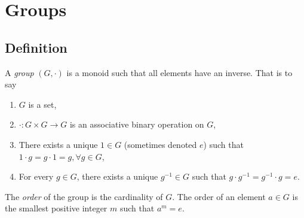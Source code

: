 \section{Groups}

\subsection{Definition}

\begin{defn}[Group]
  \label{def:group}
  A \emph{group} $(G, \cdot)$ is a monoid such that all elements have an inverse.
  That is to say
  \begin{enumerate}
    \item{$G$ is a set,
         }
    \item{$\cdot : G \times G \to G$ is an associative binary operation on $G$,
         }
    \item{There exists a unique $1 \in G$ (sometimes denoted $e$) such that
          $1 \cdot g = g \cdot 1 = g, \forall g \in G$,
         }
    \item{For every $g \in G$, there exists a unique $g^{-1} \in G$ such that
          $g \cdot g^{-1} = g^{-1} \cdot g = e$.
         }
  \end{enumerate}
  The \emph{order} of the group is the cardinality of $G$. The order
  of an element $a \in G$ is the smallest positive integer $m$ such
  that $a^m = e$.
\end{defn}


